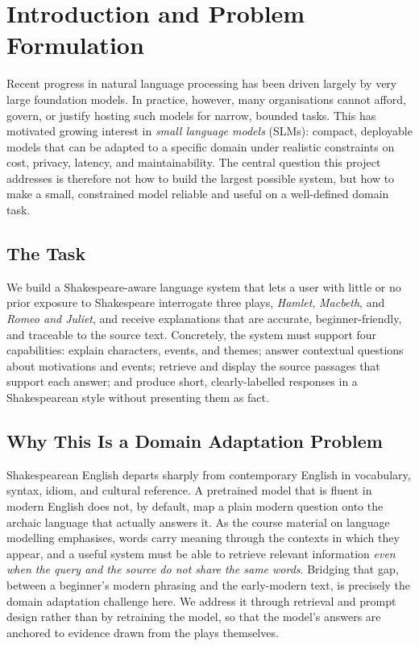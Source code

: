 \section{Introduction and Problem Formulation}
\label{sec:intro}

Recent progress in natural language processing has been driven largely
by very large foundation models. In practice, however, many
organisations cannot afford, govern, or justify hosting such models for
narrow, bounded tasks. This has motivated growing interest in
\emph{small language models} (SLMs): compact, deployable models that can
be adapted to a specific domain under realistic constraints on cost,
privacy, latency, and maintainability. The central question this project
addresses is therefore not how to build the largest possible system, but
how to make a small, constrained model reliable and useful on a
well-defined domain task.

\subsection{The Task}
We build a Shakespeare-aware language system that lets a user with little
or no prior exposure to Shakespeare interrogate three plays,
\emph{Hamlet}, \emph{Macbeth}, and \emph{Romeo and Juliet}, and receive
explanations that are accurate, beginner-friendly, and traceable to the
source text. Concretely, the system must support four capabilities:
explain characters, events, and themes; answer contextual questions
about motivations and events; retrieve and display the source passages
that support each answer; and produce short, clearly-labelled responses
in a Shakespearean style without presenting them as fact.

\subsection{Why This Is a Domain Adaptation Problem}
Shakespearean English departs sharply from contemporary English in
vocabulary, syntax, idiom, and cultural reference. A pretrained model
that is fluent in modern English does not, by default, map a plain
modern question onto the archaic language that actually answers it. As
the course material on language modelling emphasises, words carry meaning
through the contexts in which they appear, and a useful system must be
able to retrieve relevant information \emph{even when the query and the
source do not share the same words}. Bridging that gap, between a
beginner's modern phrasing and the early-modern text, is precisely the
domain adaptation challenge here. We address it through retrieval and
prompt design rather than by retraining the model, so that the model's
answers are anchored to evidence drawn from the plays themselves.

